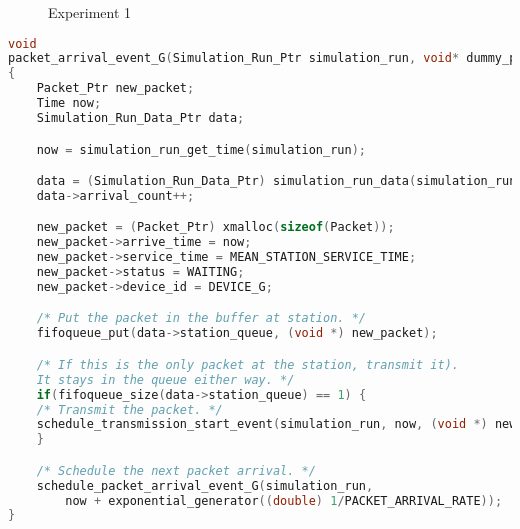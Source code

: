 \documentclass[12pt]{article}
\begin{document}
\begin{figure}[htp]
\centering
{}
\caption{Experiment 1}
\label{fig:exp1}
\end{figure}

\clearpage

\begin{lstlisting}[language=c,caption=Arrival Event, label=list:arrival]
void
packet_arrival_event_G(Simulation_Run_Ptr simulation_run, void* dummy_ptr) 
{
	Packet_Ptr new_packet;
	Time now;
	Simulation_Run_Data_Ptr data;

	now = simulation_run_get_time(simulation_run);

	data = (Simulation_Run_Data_Ptr) simulation_run_data(simulation_run);
	data->arrival_count++;

	new_packet = (Packet_Ptr) xmalloc(sizeof(Packet));
	new_packet->arrive_time = now;
	new_packet->service_time = MEAN_STATION_SERVICE_TIME;
	new_packet->status = WAITING;
	new_packet->device_id = DEVICE_G;

	/* Put the packet in the buffer at station. */
	fifoqueue_put(data->station_queue, (void *) new_packet);

	/* If this is the only packet at the station, transmit it). 
	It stays in the queue either way. */
	if(fifoqueue_size(data->station_queue) == 1) {
	/* Transmit the packet. */
	schedule_transmission_start_event(simulation_run, now, (void *) new_packet);
	}

	/* Schedule the next packet arrival. */
	schedule_packet_arrival_event_G(simulation_run, 
		now + exponential_generator((double) 1/PACKET_ARRIVAL_RATE));
}
\end{lstlisting}
\end{document}

